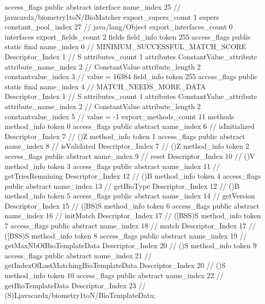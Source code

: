 {{{			access_flags	public abstract interface
			name_index	25		// javacardx/biometry1toN/BioMatcher
			export_supers_count	1
			supers {
				constant_pool_index	27		// java/lang/Object
			}
			export_interfaces_count	0
			interfaces {
			}
			export_fields_count	2
			fields {
			field_info {
				token	255
				access_flags	public static final
				name_index	0		// MINIMUM_SUCCESSFUL_MATCH_SCORE
				Descriptor_Index	1		// S
				attributes_count	1
				attributes {
				ConstantValue_attribute {
					attribute_name_index	2		// ConstantValue
					attribute_length	2
					constantvalue_index	3		// value = 16384
				}
				}
			}
			field_info {
				token	255
				access_flags	public static final
				name_index	4		// MATCH_NEEDS_MORE_DATA
				Descriptor_Index	1		// S
				attributes_count	1
				attributes {
				ConstantValue_attribute {
					attribute_name_index	2		// ConstantValue
					attribute_length	2
					constantvalue_index	5		// value = -1
				}
				}
			}
			}
			export_methods_count	11
			methods {
				method_info {
					token	0
					access_flags	public abstract
					name_index	6		// isInitialized
					Descriptor_Index	7		// ()Z
				}
				method_info {
					token	1
					access_flags	public abstract
					name_index	8		// isValidated
					Descriptor_Index	7		// ()Z
				}
				method_info {
					token	2
					access_flags	public abstract
					name_index	9		// reset
					Descriptor_Index	10		// ()V
				}
				method_info {
					token	3
					access_flags	public abstract
					name_index	11		// getTriesRemaining
					Descriptor_Index	12		// ()B
				}
				method_info {
					token	4
					access_flags	public abstract
					name_index	13		// getBioType
					Descriptor_Index	12		// ()B
				}
				method_info {
					token	5
					access_flags	public abstract
					name_index	14		// getVersion
					Descriptor_Index	15		// ([BS)S
				}
				method_info {
					token	6
					access_flags	public abstract
					name_index	16		// initMatch
					Descriptor_Index	17		// ([BSS)S
				}
				method_info {
					token	7
					access_flags	public abstract
					name_index	18		// match
					Descriptor_Index	17		// ([BSS)S
				}
				method_info {
					token	8
					access_flags	public abstract
					name_index	19		// getMaxNbOfBioTemplateData
					Descriptor_Index	20		// ()S
				}
				method_info {
					token	9
					access_flags	public abstract
					name_index	21		// getIndexOfLastMatchingBioTemplateData
					Descriptor_Index	20		// ()S
				}
				method_info {
					token	10
					access_flags	public abstract
					name_index	22		// getBioTemplateData
					Descriptor_Index	23		// (S)Ljavacardx/biometry1toN/BioTemplateData;
}}}}}
